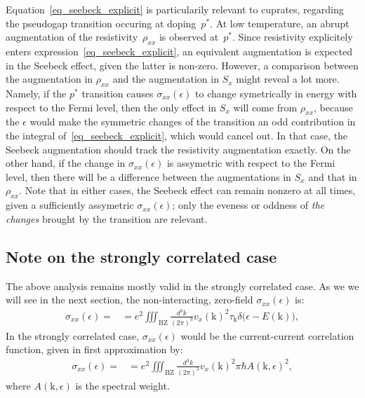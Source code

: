 \documentclass[notitlepage,11pt,nofootinbib]{revtex4-1}
\renewcommand{\vec}[1]{\bm{\mathrm{#1}}}
\begin{document}
Equation~\ref{eq_seebeck_explicit} is particularily relevant to cuprates, regarding the pseudogap transition occuring at doping~$p^*$. At low temperature, an abrupt augmentation of the resistivity~$\rho_{xx}$ is observed at~$p^*$. Since resistivity explicitely enters expression~\eqref{eq_seebeck_explicit}, an equivalent augmentation is expected in the Seebeck effect, given the latter is non-zero. However, a comparison between the augmentation in $\rho_{xx}$ and the augmentation in $S_x$ might reveal a lot more. Namely, if the $p^*$ transition causes $\sigma_{xx}(\epsilon)$ to change symetrically in energy with respect to the Fermi level, then the only effect in $S_x$ will come from $\rho_{xx}$, because the $\epsilon$ would make the symmetric changes of the transition an odd contribution in the integral of~\eqref{eq_seebeck_explicit}, which would cancel out. In that case, the Seebeck augmentation should track the resistivity augmentation exactly. On the other hand, if the change in $\sigma_{xx}(\epsilon)$ is assymetric with respect to the Fermi level, then there will be a difference between the augmentations in $S_x$ and that in $\rho_{xx}$. Note that in either cases, the Seebeck effect can remain nonzero at all times, given a sufficiently assymetric $\sigma_{xx}(\epsilon)$; only the eveness or oddness of \emph{the changes} brought by the transition are relevant.

\subsection{Note on the strongly correlated case}

The above analysis remains mostly valid in the strongly correlated case. As we we will see in the next section, the non-interacting, zero-field $\sigma_{xx}(\epsilon)$ is:
\begin{align}
\sigma_{xx}(\epsilon) = 
&=
e^2\iiint_{\text{BZ}}\frac{d^3k}{(2\pi)^3}
v_{x}(\vec k)^2
\tau_{\vec k}\delta\big(\epsilon-E(\vec k)\big),
\label{eq_will_return}
\end{align}
In the strongly correlated case, $\sigma_{xx}(\epsilon)$ would be the current-current correlation function, given in first approximation by:
\begin{align}
\sigma_{xx}(\epsilon) = 
&=
e^2\iiint_{\text{BZ}}\frac{d^3k}{(2\pi)^3}
v_{x}(\vec k)^2
\pi\hbar A(\vec k,\epsilon)^2,
\end{align}
where $A(\vec k,\epsilon)$ is the spectral weight.
\end{document}
